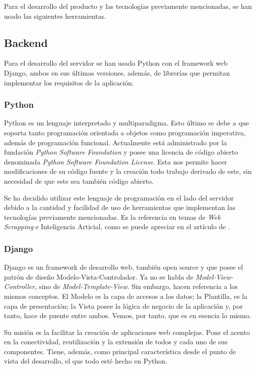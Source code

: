 Para el desarrollo del producto y las tecnologías previamente mencionadas, se han usado las siguientes herramientas.

\subsection{Backend}
Para el desarrollo del servidor se han usado Python con el framework web Django, ambos en sus últimas versiones, además, de librerías que permitan implementar los requisitos de la aplicación.

\subsubsection{Python}
Python es un lenguaje interpretado y multiparadigma. Esto último se debe a que soporta tanto programación orientada a objetos como programación imperativa, además de programación funcional. Actualmente está administrado por la fundación \textit{Python Software Foundation} y posee una licencia de código abierto denominada \textit{Python Software Foundation License}. Esta nos permite hacer modificaciones de su código fuente y la creación todo trabajo derivado de este, sin necesidad de que este sea también código abierto.

Se ha decidido utilizar este lenguaje de programación en el lado del servidor debido a la cantidad y facilidad de uso de herramientas que implementan las tecnologías previamente mencionadas. Es la referencia en temas de \textit{Web Scrapping} e Inteligencia Articial, como se puede apreciar en el artículo de .

\subsubsection{Django}
Django es un framework de desarrollo web, también open source y que posee el patrón de diseño Modelo-Vista-Controlador. Ya no se habla de \textit{Model-View-Controller}, sino de \textit{Model-Template-View}. Sin embargo, hacen referencia a los mismos conceptos. El Modelo es la capa de accesos a los datos; la Plantilla, es la capa de presentación; la Vista posee la lógica de negocio de la aplicación y, por tanto, hace de puente entre ambos. Vemos, por tanto, que es en esencia lo mismo.

Su misión es la facilitar la creación de aplicaciones web complejas. Pone el acento en la conectividad, reutilización y la extensión de todos y cada uno de sus componentes. Tiene, además, como principal característica desde el punto de vista del desarrollo, el que todo esté hecho en Python.

